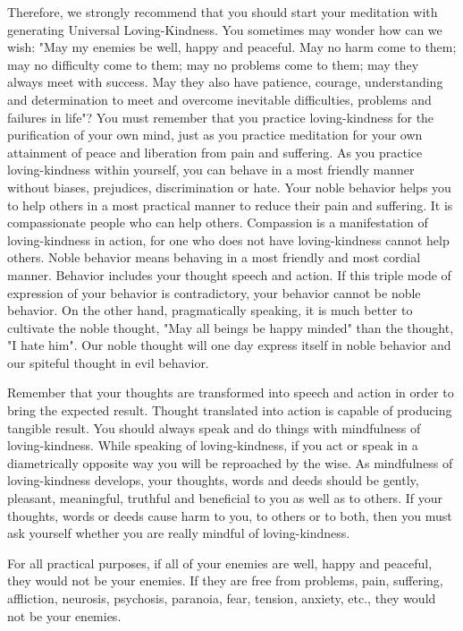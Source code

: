 Therefore, we strongly recommend that you should start your meditation with
generating Universal Loving-Kindness.
You sometimes may wonder how can we wish: "May my enemies be well, happy and peaceful. May no harm come to them; may
no difficulty come to them; may no problems come to them; may they always meet with success. May they also have patience,
courage, understanding and determination to meet and overcome inevitable difficulties, problems and failures in life"?
You must remember that you practice loving-kindness for the purification of your own mind, just as you practice meditation for
your own attainment of peace and liberation from pain and suffering. As you practice loving-kindness within yourself, you can
behave in a most friendly manner without biases, prejudices, discrimination or hate. Your noble behavior helps you to help others
in a most practical manner to reduce their pain and suffering. It is compassionate people who can help others. Compassion is a
manifestation of loving-kindness in action, for one who does not have loving-kindness cannot help others. Noble behavior means
behaving in a most friendly and most cordial manner. Behavior includes your thought speech and action. If this triple mode of
expression of your behavior is contradictory, your behavior cannot be noble behavior. On the other hand, pragmatically speaking,
it is much better to cultivate the noble thought, "May all beings be happy minded" than the thought, "I hate him". Our noble
thought will one day express itself in noble behavior and our spiteful thought in evil behavior.

Remember that your thoughts are transformed into speech and action in order to
bring the expected result. Thought translated into action is capable of
producing tangible result. You should always speak and do things with
mindfulness of loving-kindness. While speaking of loving-kindness, if you act or
speak in a diametrically opposite way you will be reproached by the wise. As
mindfulness of loving-kindness develops, your thoughts, words and deeds should
be gently, pleasant, meaningful, truthful and beneficial to you as well as to
others. If your thoughts, words or deeds cause harm to you, to others or to
both, then you must ask yourself whether you are really mindful of
loving-kindness.

For all practical purposes, if all of your enemies are well, happy and peaceful,
they would not be your enemies. If they are free from problems, pain, suffering,
affliction, neurosis, psychosis, paranoia, fear, tension, anxiety, etc., they
would not be your enemies.

